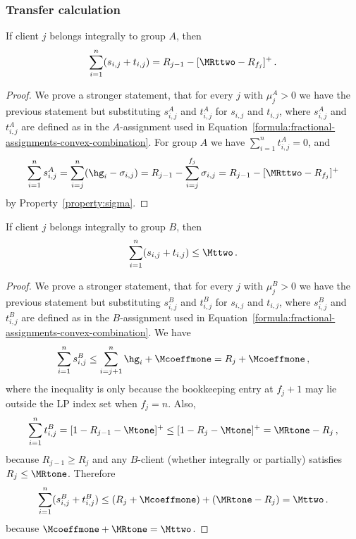 \subsubsection{Transfer calculation}


\begin{lemma}
    \label{lem:tran-A}
    If client $j$ belongs integrally to group $A$, then
    \begin{equation*}
        \sum_{i=1}^n (s_{i,j} + t_{i,j}) = R_{j-1} - [\MRttwo - R_{f_j}]^+\,.
    \end{equation*}
\end{lemma}
\begin{proof}
    We prove a stronger statement, that for every $j$ with $\mu_j^A > 0$ we have the previous statement but substituting $s_{i,j}^A$ and $t_{i,j}^A$ for $s_{i,j}$ and $t_{i,j}$, where $s_{i,j}^A$ and $t_{i,j}^A$ are defined as in the $A$-assignment used in Equation~\ref{formula:fractional-assignments-convex-combination}.
    For group $A$ we have $\sum_{i=1}^n t_{i,j}^A=0$, and
    \begin{equation*}
        \sum_{i=1}^n s_{i,j}^A = \sum_{i=j}^n (\hg_i-\sigma_{i,j}) = R_{j-1} - \sum_{i=j}^{f_j} \sigma_{i,j}
    = R_{j-1} - [\MRttwo - R_{f_j}]^+
    \end{equation*}
    by Property~\ref{property:sigma}.
\end{proof}

\begin{lemma}
    \label{lem:tran-B}
    If client $j$ belongs integrally to group $B$, then
    \begin{equation*}
        \sum_{i=1}^n (s_{i,j} + t_{i,j}) \leq \Mttwo\,.
    \end{equation*}
\end{lemma}
\begin{proof}
    We prove a stronger statement, that for every $j$ with $\mu_j^B > 0$ we have the previous statement but substituting $s_{i,j}^B$ and $t_{i,j}^B$ for $s_{i,j}$ and $t_{i,j}$, where $s_{i,j}^B$ and $t_{i,j}^B$ are defined as in the $B$-assignment used in Equation~\ref{formula:fractional-assignments-convex-combination}.
    We have
    \begin{equation*}
        \sum_{i=1}^n s_{i,j}^B \leq \sum_{i=j+1}^n \hg_i + \Mcoeffmone = R_j + \Mcoeffmone\,,
    \end{equation*}
    where the inequality is only because the bookkeeping entry at $f_j+1$ may lie outside the LP index set when $f_j=n$.
    Also,
    \begin{equation*}
        \sum_{i=1}^n t_{i,j}^B = [1-R_{j-1}-\Mtone]^+ \leq [1-R_{j}-\Mtone]^+ = \MRtone - R_j\,,
    \end{equation*}
    because $R_{j-1} \ge R_j$ and any $B$-client (whether integrally or partially) satisfies $R_{j} \le \MRtone$.
    Therefore
    \begin{equation*}
        \sum_{i=1}^n (s_{i,j}^B+t_{i,j}^B) \le (R_j+\Mcoeffmone) + (\MRtone-R_j) = \Mttwo\,.
    \end{equation*}
    because $\Mcoeffmone + \MRtone = \Mttwo$.
\end{proof}

